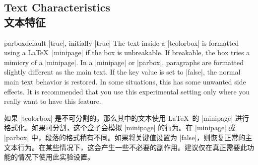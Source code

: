 \subsection{Text Characteristics\\文本特征}

\begin{docTcbKey}[][doc updated=2015-10-14]{parbox}{}{default |true|, initially |true|}
The text inside a |tcolorbox| is formatted using a \LaTeX\ |minipage|
if the box is unbreakable. 
If breakable, the box tries a mimicry of a |minipage|. 
In a |minipage| or |parbox|, paragraphs are formatted slightly different
as the main text. If the key value is set to |false|, the normal main text
behavior is restored. In some situations, this has some unwanted side
effects. It is recommended that you use this experimental setting only
where you really want to have this feature.

如果 |tcolorbox| 是不可分割的，那么其中的文本使用 \LaTeX\ 的 |minipage| 进行格式化。如果可分割，这个盒子会模拟 |minipage| 的行为。在 |minipage| 或 |parbox| 中，段落的格式稍有不同。如果将关键值设置为 |false|，则恢复正常的主文本行为。在某些情况下，这会产生一些不必要的副作用。建议仅在真正需要此功能的情况下使用此实验设置。

\end{docTcbKey}

\begin{dispListing}

\begin{tcolorbox}[parbox,adjusted title={parbox=true (normal)}]
\lipsum[1-2]
\end{tcolorbox}\hfill%
\begin{tcolorbox}[parbox=false,adjusted title={parbox=false}]
\lipsum[1-2]
\end{tcolorbox}%
\end{dispListing}
{\tcbusetemp}




